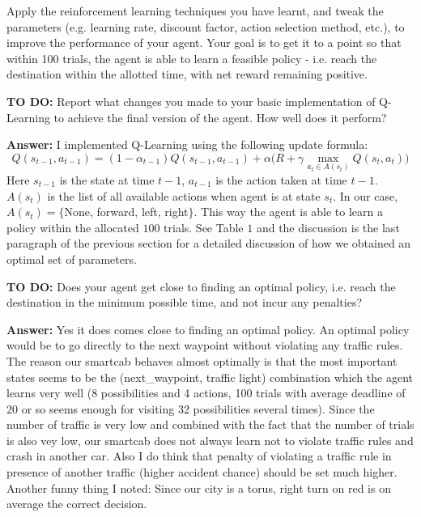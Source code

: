 \documentclass{article}
\begin{document}
Apply the reinforcement learning techniques you have learnt, and tweak the parameters (e.g. learning rate, discount factor, action selection method, etc.), to improve the performance of your agent. Your goal is to get it to a point so that within 100 trials, the agent is able to learn a feasible policy - i.e. reach the destination within the allotted time, with net reward remaining positive.


\vspace{.5cm}

\noindent\textbf{TO DO:} Report what changes you made to your basic implementation of Q-Learning to achieve the final version of the agent. How well does it perform?

\vspace{.2cm}

\noindent\textbf{Answer:} I implemented Q-Learning using the following update formula: 
$$Q(s_{t-1},a_{t-1})=(1-\alpha_{t-1})Q(s_{t-1},a_{t-1})+\alpha\big(R+\gamma\max_{a_{t}\in A(s_{t})}Q(s_{t},a_{t})\big)$$
 Here $s_{t-1}$ is the state at time $t-1$, $a_{t-1}$ is the action taken at time $t-1$. $A(s_t)$  is the list of all available actions when agent is at state $s_t$. In our case, $A(s_t)=\{$None, forward, left, right$\}$. This way the agent is able to learn a policy within the allocated $100$ trials. See Table $1$ and the discussion is the last paragraph of the previous section for a detailed discussion of how we obtained an optimal set of parameters.

\vspace{.5cm}

\noindent\textbf{TO DO:} Does your agent get close to finding an optimal policy, i.e. reach the destination in the minimum possible time, and not incur any penalties?

\vspace{.2cm}

\noindent\textbf{Answer:} Yes it does comes close to finding an optimal policy. An optimal policy would be to go directly to the next waypoint without violating any traffic rules. The reason our smartcab behaves almost optimally is that the most important states seems to be the (next\_waypoint, traffic light) combination which the agent learns very well (8 possibilities and 4 actions, 100 trials with average deadline of 20 or so seems enough for visiting 32 possibilities several times). Since the number of traffic is very low and combined with the fact that the number of trials is also vey low, our smartcab does not always learn not to violate traffic rules and crash in another car. Also I do think that penalty of violating a traffic rule in presence of another traffic (higher accident chance) should be set much higher. Another funny thing I noted: Since our city is a torus, right turn on red is on average the correct decision.
\end{document}

